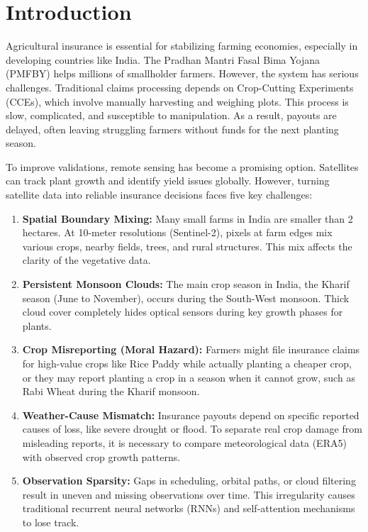 \documentclass[conference]{IEEEtran}
\begin{document}
\section{Introduction}
Agricultural insurance is essential for stabilizing farming economies, especially in developing countries like India. The Pradhan Mantri Fasal Bima Yojana (PMFBY) helps millions of smallholder farmers\cite{b1}. However, the system has serious challenges. Traditional claims processing depends on Crop-Cutting Experiments (CCEs), which involve manually harvesting and weighing plots. This process is slow, complicated, and susceptible to manipulation. As a result, payouts are delayed, often leaving struggling farmers without funds for the next planting season.

To improve validations, remote sensing has become a promising option. Satellites can track plant growth and identify yield issues globally. However, turning satellite data into reliable insurance decisions faces five key challenges:  

\begin{enumerate}
\item \textbf{Spatial Boundary Mixing:} Many small farms in India are smaller than 2 hectares. At 10-meter resolutions (Sentinel-2), pixels at farm edges mix various crops, nearby fields, trees, and rural structures. This mix affects the clarity of the vegetative data.
\item \textbf{Persistent Monsoon Clouds:} The main crop season in India, the Kharif season (June to November), occurs during the South-West monsoon. Thick cloud cover completely hides optical sensors during key growth phases for plants.  
\item \textbf{Crop Misreporting (Moral Hazard):} Farmers might file insurance claims for high-value crops like Rice Paddy while actually planting a cheaper crop, or they may report planting a crop in a season when it cannot grow, such as Rabi Wheat during the Kharif monsoon.  
\item \textbf{Weather-Cause Mismatch:} Insurance payouts depend on specific reported causes of loss, like severe drought or flood. To separate real crop damage from misleading reports, it is necessary to compare meteorological data (ERA5) with observed crop growth patterns.  
\item \textbf{Observation Sparsity:} Gaps in scheduling, orbital paths, or cloud filtering result in uneven and missing observations over time. This irregularity causes traditional recurrent neural networks (RNNs) and self-attention mechanisms to lose track.  
\end{enumerate}
\end{document}

